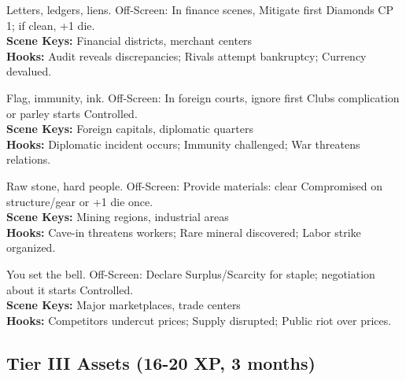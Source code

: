 \documentclass[12pt]{article}
\begin{document}
\begin{description}[leftmargin=*]
  \item[\textbf{Banking Charter}] Letters, ledgers, liens. Off-Screen: In finance scenes, Mitigate first Diamonds CP 1; if clean, +1 die. \\
  \textbf{Scene Keys:} Financial districts, merchant centers \\
  \textbf{Hooks:} Audit reveals discrepancies; Rivals attempt bankruptcy; Currency devalued.

  \item[\textbf{Diplomatic Enclave}] Flag, immunity, ink. Off-Screen: In foreign courts, ignore first Clubs complication or parley starts Controlled. \\
  \textbf{Scene Keys:} Foreign capitals, diplomatic quarters \\
  \textbf{Hooks:} Diplomatic incident occurs; Immunity challenged; War threatens relations.

  \item[\textbf{Mine/Quarry Operation}] Raw stone, hard people. Off-Screen: Provide materials: clear Compromised on structure/gear or +1 die once. \\
  \textbf{Scene Keys:} Mining regions, industrial areas \\
  \textbf{Hooks:} Cave-in threatens workers; Rare mineral discovered; Labor strike organized.

  \item[\textbf{Market Control}] You set the bell. Off-Screen: Declare Surplus/Scarcity for staple; negotiation about it starts Controlled. \\
  \textbf{Scene Keys:} Major marketplaces, trade centers \\
  \textbf{Hooks:} Competitors undercut prices; Supply disrupted; Public riot over prices.
\end{description}

\subsection*{Tier III Assets (16-20 XP, 3 months)}
\end{document}
